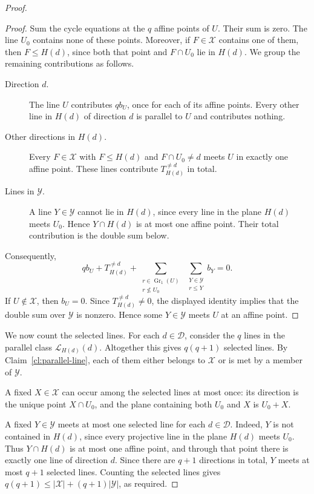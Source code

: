 \documentclass[11pt]{article}
\numberwithin{equation}{section}
\newcommand{\Gr}{\operatorname{Gr}}
\begin{document}
\begin{proof}
\begin{proof}
Sum the cycle equations at the $q$ affine points of $U$. Their sum is
zero. The line $U_0$ contains none of these points. Moreover, if
$F\in\mathcal X$ contains one of them, then $F\le H(d)$, since both
that point and $F\cap U_0$ lie in $H(d)$. We group the remaining
contributions as follows.

\begin{description}
\item[Direction $d$.]
The line $U$ contributes $q b_U$, once for each of its affine points.
Every other line in $H(d)$ of direction $d$ is parallel to $U$ and
contributes nothing.

\item[Other directions in $H(d)$.]
Every $F\in\mathcal X$ with $F\le H(d)$ and $F\cap U_0\ne d$ meets $U$
in exactly one affine point. These lines contribute
$T_{H(d)}^{\ne d}$ in total.

\item[Lines in $\mathcal Y$.]
A line $Y\in\mathcal Y$ cannot lie in $H(d)$, since every line in the
plane $H(d)$ meets $U_0$. Hence $Y\cap H(d)$ is at most one affine
point. Their total contribution is the double sum below.
\end{description}

Consequently,
\[
 q b_U+T_{H(d)}^{\ne d}
 +
 \sum_{\substack{r\in\Gr_1(U)\\r\nleq U_0}}
 \ \sum_{\substack{Y\in\mathcal Y\\r\le Y}} b_Y
 =0.
\]
If $U\notin\mathcal X$, then $b_U=0$. Since
$T_{H(d)}^{\ne d}\ne0$, the displayed identity implies that the
double sum over $\mathcal Y$ is nonzero. Hence some $Y\in\mathcal Y$
meets $U$ at an affine point.
\end{proof}

We now count the selected lines. For each $d\in\mathcal D$, consider
the $q$ lines in the parallel class $\mathcal L_{H(d)}(d)$. Altogether
this gives $q(q+1)$ selected lines. By Claim~\ref{cl:parallel-line}, each
of them either belongs to $\mathcal X$ or is met by a member of
$\mathcal Y$.

A fixed $X\in\mathcal X$ can occur among the selected lines at most
once: its direction is the unique point $X\cap U_0$, and the plane
containing both $U_0$ and $X$ is $U_0+X$.

A fixed $Y\in\mathcal Y$ meets at most one selected line for each
$d\in\mathcal D$. Indeed, $Y$ is not contained in $H(d)$, since every
projective line in the plane $H(d)$ meets $U_0$. Thus $Y\cap H(d)$ is
at most one affine point, and through that point there is exactly one
line of direction $d$. Since there are $q+1$ directions in total,
$Y$ meets at most $q+1$ selected lines. Counting the selected lines
gives $q(q+1)\le |\mathcal X|+(q+1)|\mathcal Y|$, as required.
\end{proof}
\end{document}
